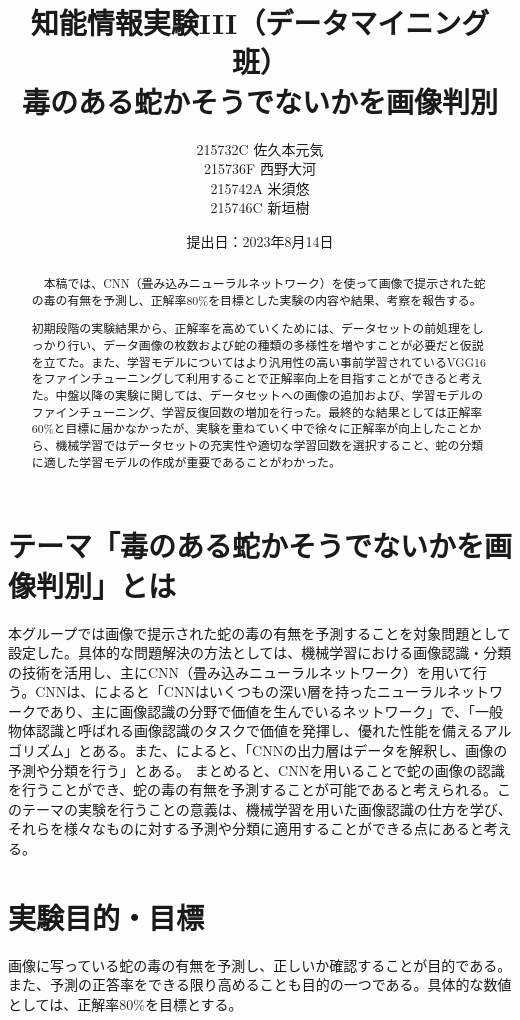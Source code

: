 \documentclass[a4paper, 11pt, titlepage]{jsarticle}
\title{知能情報実験III（データマイニング班）\\毒のある蛇かそうでないかを画像判別}
\author{215732C 佐久本元気\\215736F 西野大河\\215742A 米須悠\\215746C 新垣樹\\}
\date{提出日：2023年8月14日}
\begin{document}
\maketitle

\begin{abstract}
　本稿では、CNN（畳み込みニューラルネットワーク）を使って画像で提示された蛇の毒の有無を予測し、正解率80\%を目標とした実験の内容や結果、考察を報告する。\par
初期段階の実験結果から、正解率を高めていくためには、データセットの前処理をしっかり行い、データ画像の枚数および蛇の種類の多様性を増やすことが必要だと仮説を立てた。また、学習モデルについてはより汎用性の高い事前学習されているVGG16をファインチューニングして利用することで正解率向上を目指すことができると考えた。中盤以降の実験に関しては、データセットへの画像の追加および、学習モデルのファインチューニング、学習反復回数の増加を行った。最終的な結果としては正解率60\%と目標に届かなかったが、実験を重ねていく中で徐々に正解率が向上したことから、機械学習ではデータセットの充実性や適切な学習回数を選択すること、蛇の分類に適した学習モデルの作成が重要であることがわかった。
\end{abstract}

\tableofcontents

\section{テーマ「毒のある蛇かそうでないかを画像判別」とは}
本グループでは画像で提示された蛇の毒の有無を予測することを対象問題として設定した。具体的な問題解決の方法としては、機械学習における画像認識・分類の技術を活用し、主にCNN（畳み込みニューラルネットワーク）を用いて行う。CNNは、\cite{theme1}によると「CNNはいくつもの深い層を持ったニューラルネットワークであり、主に画像認識の分野で価値を生んでいるネットワーク」で、「一般物体認識と呼ばれる画像認識のタスクで価値を発揮し、優れた性能を備えるアルゴリズム」とある。また、\cite{theme2}によると、「CNNの出力層はデータを解釈し、画像の予測や分類を行う」とある。
まとめると、CNNを用いることで蛇の画像の認識を行うことができ、蛇の毒の有無を予測することが可能であると考えられる。このテーマの実験を行うことの意義は、機械学習を用いた画像認識の仕方を学び、それらを様々なものに対する予測や分類に適用することができる点にあると考える。

\section{実験目的・目標}
画像に写っている蛇の毒の有無を予測し、正しいか確認することが目的である。また、予測の正答率をできる限り高めることも目的の一つである。具体的な数値としては、正解率80\%を目標とする。
\end{document}
